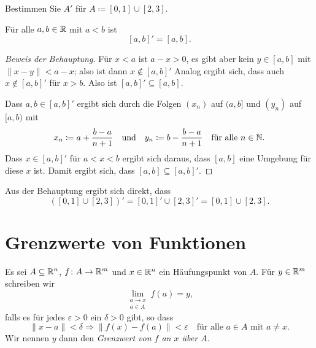 \documentclass[a4paper,10pt]{article}
\begin{document}
\begin{question}
 Bestimmen Sie $A'$ für $A \coloneqq [0,1] \cup [2,3]$.
\end{question}
\begin{solution}
 \begin{beh}
  Für alle $a, b \in \mathbb{R}$ mit $a < b$ ist
  \[
   [a,b]' = [a,b].
  \]
 \end{beh}
 \begin{proof}[Beweis der Behauptung]
  Für $x < a$  ist $a - x > 0$, es gibt aber kein $y \in [a,b]$ mit $\|x-y\| < a-x$; also ist dann $x \notin [a,b]'$ Analog ergibt sich, dass auch $x \notin [a,b]'$ für $x > b$. Also ist $[a,b]' \subseteq [a,b]$.
  
  Dass $a,b \in [a,b]'$ ergibt sich durch die Folgen $(x_n)$ auf $(a,b]$ und $(y_n)$ auf $[a,b)$ mit
  \[
   x_n \coloneqq a + \frac{b-a}{n+1}
   \quad
   \text{und}
   \quad
   y_n \coloneqq b - \frac{b-a}{n+1}
   \quad
   \text{für alle $n \in \mathbb{N}$}.
  \]
  Dass $x \in [a,b]'$ für $a < x < b$ ergibt sich daraus, dass $[a,b]$ eine Umgebung für diese $x$ ist. Damit ergibt sich, dass $[a,b] \subseteq [a,b]'$.
 \end{proof}
 
 Aus der Behauptung ergibt sich direkt, dass
 \[
  ([0,1] \cup [2,3])'
  = [0,1]' \cup [2,3]'
  = [0,1] \cup [2,3].
 \]
\end{solution}





\section{Grenzwerte von Funktionen}


\begin{defi}
 Es sei $A \subseteq \mathbb{R}^n$, $f \colon A \to \mathbb{R}^m$ und $x \in \mathbb{R}^n$ ein Häufungspunkt von $A$. Für $y \in \mathbb{R}^m$ schreiben wir
 \[
  \lim_{\substack{a \to x \\ a \in A}} f(a) = y,
 \]
 falls es für jedes $\varepsilon > 0$ ein $\delta > 0$ gibt, so dass
 \[
  \|x-a\| < \delta \Rightarrow \|f(x)-f(a)\| < \varepsilon
  \quad
  \text{für alle $a \in A$ mit $a \neq x$}.
 \]
 Wir nennen $y$ dann den \emph{Grenzwert von $f$ an $x$ über $A$}.
\end{defi}
\end{document}
